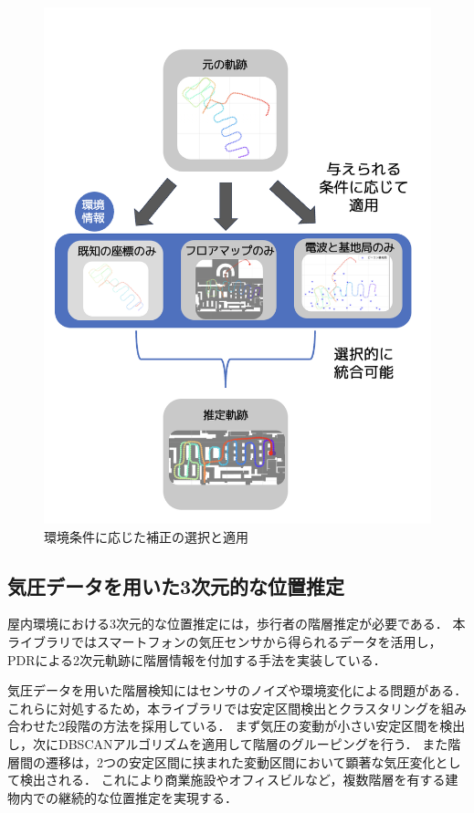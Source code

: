 \documentclass[a4paper, 10pt, twocolumn]{jarticle}
\begin{document}
\begin{figure}[h]
    \centering
    \includegraphics[width=\linewidth]{image/integrate8.jpg}
    \caption{環境条件に応じた補正の選択と適用}
    \label{fig:corrector-class}
\end{figure}


\subsection{気圧データを用いた3次元的な位置推定}
屋内環境における3次元的な位置推定には，歩行者の階層推定が必要である．
本ライブラリではスマートフォンの気圧センサから得られるデータを活用し，
PDRによる2次元軌跡に階層情報を付加する手法を実装している．

気圧データを用いた階層検知にはセンサのノイズや環境変化による問題がある．
これらに対処するため，本ライブラリでは安定区間検出とクラスタリングを組み合わせた2段階の方法を採用している．
まず気圧の変動が小さい安定区間を検出し，次にDBSCANアルゴリズムを適用して階層のグルーピングを行う．
また階層間の遷移は，2つの安定区間に挟まれた変動区間において顕著な気圧変化として検出される．
これにより商業施設やオフィスビルなど，複数階層を有する建物内での継続的な位置推定を実現する．
\end{document}
